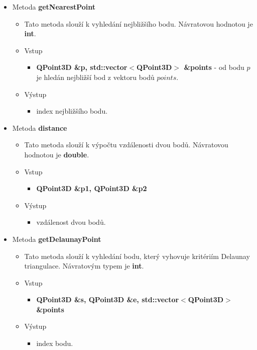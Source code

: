 \documentclass[a4paper, 12pt]{article}
\begin{document}
\begin{itemize}
	\item Metoda \textbf{getNearestPoint}		
	\begin{itemize}
		\item Tato metoda slouží k vyhledání nejbližšího bodu. Návratovou hodnotou je \textbf{int}.
		\item Vstup
		\begin{itemize}
			\item \textbf{QPoint3D \&p, std::vector$<$QPoint3D$>$ \&points} - od bodu $p$ je hledán nejbližší bod z vektoru bodů $points$.
		\end{itemize}
		\item Výstup
		\begin{itemize}	
			\item index nejbližšího bodu.
		\end{itemize}
	\end{itemize}	
	
	\item Metoda \textbf{distance}		
	\begin{itemize}
		\item Tato metoda slouží k výpočtu vzdálenosti dvou bodů. Návratovou hodnotou je \textbf{double}.
		\item Vstup
		\begin{itemize}
			\item \textbf{QPoint3D \&p1, QPoint3D \&p2} 
		\end{itemize}
		\item Výstup
		\begin{itemize}	
			\item vzdálenost dvou bodů.
		\end{itemize}
	\end{itemize}

	\item Metoda \textbf{getDelaunayPoint}		
\begin{itemize}
	\item Tato metoda slouží k vyhledání bodu, který vyhovuje kritériím Delaunay triangulace. Návratovým typem je \textbf{int}.
	\item Vstup
	\begin{itemize}
		\item \textbf{QPoint3D \&s, QPoint3D \&e, std::vector$<$QPoint3D$>$ \&points} 
	\end{itemize}
	\item Výstup
	\begin{itemize}	
		\item index bodu.
	\end{itemize}
\end{itemize}


\end{itemize}
\end{document}
